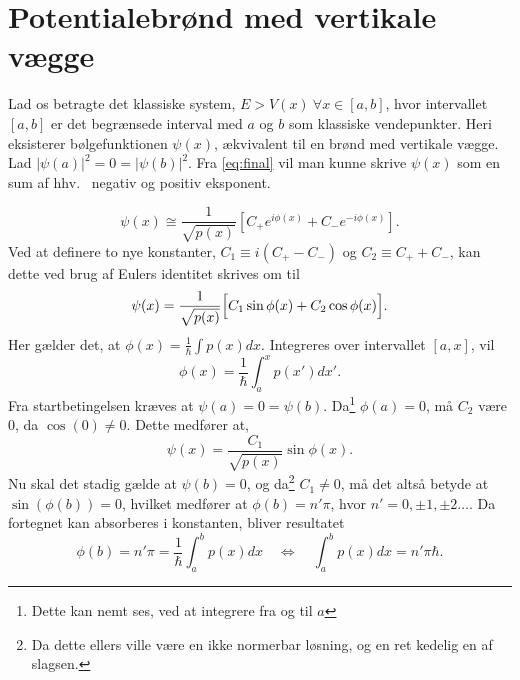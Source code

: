 \section{Potentialebrønd med vertikale vægge}
Lad os betragte det klassiske system, $E > V(x) \ \forall x \in[a,b]$, hvor intervallet $[a,b]$ er det begrænsede interval med $a$ og $b$ som klassiske vendepunkter. Heri eksisterer bølgefunktionen $\psi(x)$, ækvivalent til en brønd med vertikale vægge. Lad $|\psi(a)|^{2} = 0 = |\psi(b)|^{2}$. Fra \cref{eq:final} vil man kunne skrive $\psi(x)$ som en sum af hhv. \ negativ og positiv eksponent.

\begin{equation}
    \psi(x) \cong \frac{1}{\sqrt{p(x)}}\left[C_{+}e^{i\phi(x)}+C_{-}e^{-i\phi(x)}\right].
  \label{eq:kvantiseringStart}
\end{equation}
Ved at definere to nye konstanter, $C_1 \equiv i(C_{+}-C_{-})$ og $C_2 \equiv C_{+}+C_{-}$, kan dette ved brug af Eulers identitet skrives om til
\begin{equation}
  \psi(x) = \frac{1}{\sqrt{p(x)}}
  \Bigl[    C_1\sin{\phi(x)} + C_2\cos{\phi(x)}   \Bigr].
  \label{eq:kvantiseringSinCos}
\end{equation}
Her gælder det, at $\phi(x) = \frac{1}{\hbar}\int p(x) dx$. Integreres over intervallet $[a, x]$, vil
\begin{equation}
  \phi(x) = \frac{1}{\hbar}\int_{a}^{x} p(x')dx'.
\end{equation}
Fra startbetingelsen kræves at $\psi(a) = 0 = \psi(b)$. Da\footnote{Dette kan nemt ses, ved at integrere fra og til $a$} $\phi(a) = 0$, må $C_2$ være 0, da $\cos(0)\neq 0$. Dette medfører at,
\begin{equation}
    \psi(x) = \frac{C_1}{\sqrt{p(x)}}\sin{\phi(x)}.
\end{equation}
Nu skal det stadig gælde at $\psi(b) = 0$, og da\footnote{Da dette ellers ville være en ikke normerbar løsning, og en ret kedelig en af slagsen.} $C_1\neq 0$, må det altså betyde at $\sin(\phi(b)) = 0$, hvilket medfører at $\phi(b) = n'\pi$, hvor $n' = 0, \pm1, \pm2\ldots$. Da fortegnet kan absorberes i konstanten, bliver resultatet
\begin{equation}
    \phi(b) = n'\pi = \frac{1}{\hbar}\int_{a}^{b} p(x) dx \quad \Leftrightarrow \quad \int_{a}^{b} p(x) dx = n'\pi\hbar.
  \label{eq:kvantiDone}
\end{equation}
